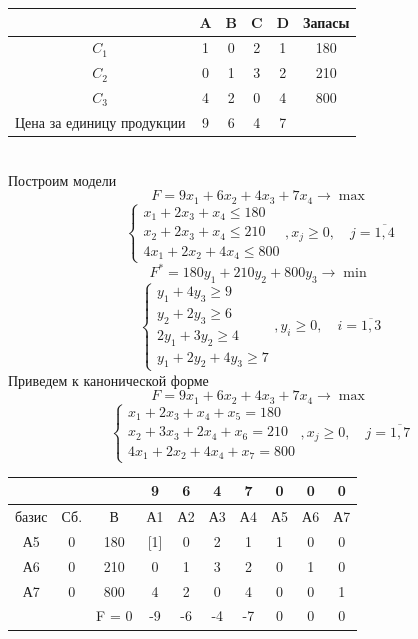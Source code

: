 \documentclass[17pt]{extarticle}
\begin{document}
\begin{tabular}{|c|c|c|c|c|c|}
    \hline
                              & A & B & C & D & Запасы \\
    \hline
    $C_1$                     & 1 & 0 & 2 & 1 & 180    \\
    \hline
    $C_2$                     & 0 & 1 & 3 & 2 & 210    \\
    \hline
    $C_3$                     & 4 & 2 & 0 & 4 & 800    \\
    \hline
    Цена за единицу продукции & 9 & 6 & 4 & 7 &        \\
    \hline
\end{tabular} \\
Построим модели
\[
    F = 9x_1 + 6x_2 + 4x_3 + 7x_4 \rightarrow \max
\]
\[
    \begin{cases}
        x_1 + 2x_3 + x_4 \leq 180 \\
        x_2 + 2x_3 + x_4 \leq 210 \\
        4x_1 + 2x_2 + 4x_4 \leq 800
    \end{cases}, x_j \geq 0, \quad j = \overline{1,4}
\]
\[
    F^* = 180y_1 + 210y_2 + 800y_3 \rightarrow \min
\]
\[
    \begin{cases}
        y_1 + 4y_3 \geq 9  \\
        y_2 + 2y_3 \geq 6  \\
        2y_1 + 3y_2 \geq 4 \\
        y_1 + 2y_2 + 4y_3 \geq 7
    \end{cases}, y_i \geq 0, \quad i = \overline{1,3}
\]
Приведем к канонической форме
\[
    F = 9x_1 + 6x_2 + 4x_3 + 7x_4 \rightarrow \max
\]
\[
    \begin{cases}
        x_1 + 2x_3 + x_4 + x_5 = 180  \\
        x_2 + 3x_3 + 2x_4 + x_6 = 210 \\
        4x_1 + 2x_2 + 4x_4 + x_7 = 800
    \end{cases}, x_j \geq 0, \quad j = \overline{1,7}
\]
\begin{tabular}{|c|c|c|c|c|c|c|c|c|c|}
    \hline
          &     &       & 9   & 6  & 4  & 7  & 0  & 0  & 0  \\
    \hline
    базис & Сб. & В     & А1  & А2 & А3 & А4 & А5 & А6 & А7 \\
    \hline
    А5    & 0   & 180   & [1] & 0  & 2  & 1  & 1  & 0  & 0  \\
    \hline
    А6    & 0   & 210   & 0   & 1  & 3  & 2  & 0  & 1  & 0  \\
    \hline
    А7    & 0   & 800   & 4   & 2  & 0  & 4  & 0  & 0  & 1  \\
    \hline
          &     & F = 0 & -9  & -6 & -4 & -7 & 0  & 0  & 0  \\
    \hline
\end{tabular}
\end{document}
